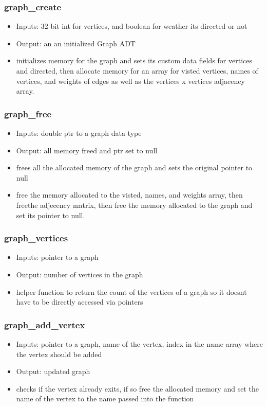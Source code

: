 \documentclass{article}
\begin{document}
\subsubsection{graph\_create}
\begin{itemize}
    \item Inputs: 32 bit int for vertices, and boolean for weather its directed or not 
    \item Output: an an initialized Graph ADT
    \item initializes memory for the graph and sets its custom data fields for vertices and directed, then allocate memory for an array for visted vertices, names of vertices, and weights of edges as well as the vertices x vertices adjacency array.
\end{itemize}
\subsubsection{graph\_free}
\begin{itemize}
    \item Inputs: double ptr to a graph data type
    \item Output: all memory freed and ptr set to null
    \item frees all the allocated memory of the graph  and sets the original pointer to null
    \item free the memory allocated to the visted, names, and weights array, then freethe adjecency matrix, then free the memory allocated to the graph and set its pointer to null.
\end{itemize}
\subsubsection{graph\_vertices}
\begin{itemize}
    \item Inputs: pointer to a graph  
    \item Output: number of vertices in the graph
    \item helper function to return the count of the vertices of a graph so it doesnt have to be directly accessed via pointers
\end{itemize}
\subsubsection{graph\_add\_vertex}
\begin{itemize}
    \item Inputs: pointer to a graph, name of the vertex, index in the name array where the vertex should be added
    \item Output: updated graph 
    \item checks if the vertex already exits, if so free the allocated memory and set the name of the vertex to the name passed into the function 
\end{itemize}
\end{document}
